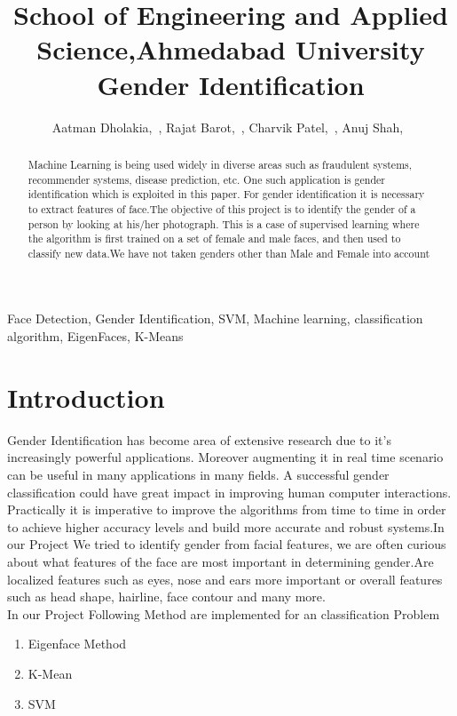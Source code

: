 \documentclass[journal]{IEEEtran}
\begin{document}
	\title{School of Engineering and Applied Science,Ahmedabad University\\Gender Identification}
	
	\author{Aatman Dholakia,~,
		Rajat Barot,~,
		Charvik Patel,~, 
		Anuj Shah,~}
	
	
	
	
	\maketitle
	
	
	\begin{abstract}
		Machine Learning is being used widely in diverse areas such as fraudulent systems, recommender systems, disease prediction, etc. One such application is gender identification which is exploited in this paper. For gender identification it is necessary to extract features of face.The objective of this project is to identify the gender of a person by looking at his/her photograph. This is a case of supervised learning where the algorithm is first trained on a set of female and male faces, and then used to classify new data.We have not taken genders other than Male and Female into account 
		
	\end{abstract}
	\begin{IEEEkeywords}
		Face Detection, Gender Identification, SVM, Machine learning, classification algorithm, EigenFaces, K-Means
	\end{IEEEkeywords}
	
	
	\IEEEpeerreviewmaketitle
	
	
	
	\section{\textbf{Introduction}}
	Gender Identification has become area of extensive research due to it's increasingly powerful applications. Moreover augmenting it in real time scenario can be useful in many applications in many fields. A successful gender classification could have great impact in improving human computer interactions. Practically it is imperative to improve the algorithms from time to time in order to achieve higher accuracy levels and build more accurate and robust systems.In our Project We tried to identify gender from facial features, we are often curious about what
	features of the face are most important in determining gender.Are localized features
	such as eyes, nose and ears more important or overall features such as head shape,
	hairline, face contour and many more.\\
	In our Project Following Method are implemented for an classification Problem 
	\begin{enumerate}
		\item Eigenface Method
		\item K-Mean
		\item SVM
	\end{enumerate}
	
\end{document}
